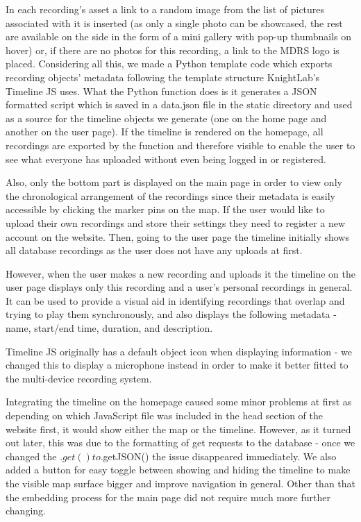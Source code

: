 \documentclass{l3proj}
\begin{document}
In each recording's asset a link to a random image from the list of pictures associated with it is inserted (as only a single photo can be showcased, the rest are available on the side in the form of a mini gallery with pop-up thumbnails on hover) or, if there are no photos for this recording, a link to the MDRS logo is placed. Considering all this, we made a \gls{Python} template code which exports recording objects' metadata following the template structure KnightLab's Timeline JS uses. What the Python function does is it generates a JSON formatted script which is saved in a data.json file in the static directory and used as a source for the timeline objects we generate (one on the home page and another on the user page). If the timeline is rendered on the homepage, all recordings are exported by the function and therefore visible to enable the user to see what everyone has uploaded without even being logged in or registered.

Also, only the bottom part is displayed on the main page in order to view only the chronological arrangement of the recordings since their metadata is easily accessible by clicking the marker pins on the map.
If the user would like to upload their own recordings and store their settings they need to register a new account on the website.
Then, going to the user page the timeline initially shows all database recordings as the user does not have any uploads at first.

However, when the user makes a new recording and uploads it the timeline on the user page displays only this recording and a user's personal recordings in general.
It can be used to provide a visual aid in identifying recordings that overlap and trying to play them synchronously, and also displays the following metadata - name, start/end time, duration, and description.

Timeline JS originally has a default object icon when displaying information - we changed this to display a microphone instead in order to make it better fitted to the multi-device recording system.

Integrating the timeline on the homepage caused some minor problems at first as depending on which \gls{JavaScript} file was included in the head section of the website first, it would show either the map or the timeline. However, as it turned out later, this was due to the formatting of get requests to the database - once we changed the $.get() to $.getJSON() the issue disappeared immediately. We also added a button for easy toggle between showing and hiding the timeline to make the visible map surface bigger and improve navigation in general.
Other than that the embedding process for the main page did not require much more further changing.
\end{document}
